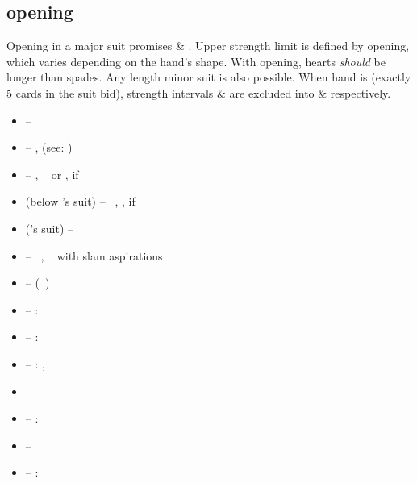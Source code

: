 \subsection{\ctr{1\protect\major} opening}
\label{subsec:1maj-op}

Opening in a major suit promises  \& . Upper strength limit is defined by \ctr{2\c} opening,
which varies depending on the hand's shape. With \ctr{1\h} opening, hearts \emph{should} be longer
than spades. Any length minor suit is also possible. When hand is \bal\/ (exactly 5 cards in the suit bid), strength
intervals  \&  are excluded into \ctr{1\nt} \& \ctr{2\nt} respectively. \vspace{1em}

\begin{itemize}
   \newcommand{\strongws}{\hcp{16}{} if \ws{}}

  \item \ctr{1\s} --  
  \item \ctr{1\nt} -- \art, \force\/ (see: \hyperref[subsec:1nt-fc]{})
  \item \ctr{2\c} -- \semi\nat, \gf\ \bal\/ or , \strongws
  \item \ctr{2\d/\h} (below \opn's suit) -- \nat\ \gf, , \strongws
  \item \ctr{2\major} (\opn's suit) --  \ws{}
  \item \ctr{2\s} -- \nat\ \gf, \sol\  with slam aspirations
  \item \ctr{2\nt} -- \hyperref[subsec:jacoby]{} (\gf\ \ws{})
  \item \ctr{3\c} -- :  
  \item \ctr{3\d} -- :  
  \item {} -- :  , 
  \item {} -- \preempt\ 
  \item \ctr{3\s} -- : \gf\  \ws{} \shortness{\s}
  \item \ctr{3\nt} -- \so
  \item \ctr{4\minor} -- : \gf\  \ws{} \shortness{\minor}
\end{itemize}
